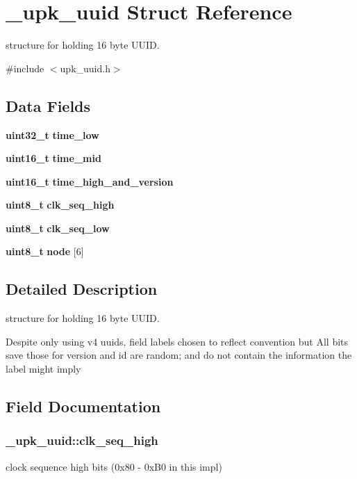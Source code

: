 \section{\_\-upk\_\-uuid Struct Reference}
\label{struct__upk__uuid}


structure for holding 16 byte UUID.  




{\ttfamily \#include $<$upk\_\-uuid.h$>$}

\subsection*{Data Fields}
\begin{DoxyCompactItemize}
\item 
{\bf uint32\_\-t} {\bf time\_\-low}
\item 
{\bf uint16\_\-t} {\bf time\_\-mid}
\item 
{\bf uint16\_\-t} {\bf time\_\-high\_\-and\_\-version}
\item 
{\bf uint8\_\-t} {\bf clk\_\-seq\_\-high}
\item 
{\bf uint8\_\-t} {\bf clk\_\-seq\_\-low}
\item 
{\bf uint8\_\-t} {\bf node} [6]
\end{DoxyCompactItemize}


\subsection{Detailed Description}
structure for holding 16 byte UUID. 

Despite only using v4 uuids, field labels chosen to reflect convention but All bits save those for version and id are random; and do not contain the information the label might imply 

\subsection{Field Documentation}
\subsubsection[{clk\_\-seq\_\-high}]{ {\bf \_\-upk\_\-uuid::clk\_\-seq\_\-high}}\label{struct__upk__uuid_a9381639878467a2c59e90271b7a6525f}
clock sequence high bits (0x80 -\/ 0xB0 in this impl) 

